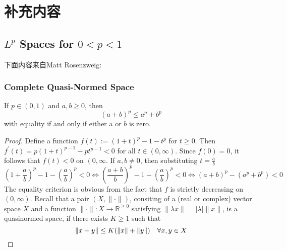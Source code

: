 \chapter{补充内容}
\section{$L^{p}$ Spaces for $0<p<1$}
下面内容来自Matt Rosenzweig:
\subsection{Complete Quasi-Normed Space}
\begin{lemma}
If $p \in(0,1)$ and $a, b \geq 0$, then
\[
    (a+b)^{p} \leq a^{p}+b^{p}
\]
with equality if and only if either a or $b$ is zero.
\end{lemma}
\begin{proof}
    Define a function $f(t):=(1+t)^{p}-1-t^{p}$ for $t \geq 0 .$ Then $f^{\prime}(t)=p(1+t)^{p-1}-p t^{p-1}<0$ for all $t \in(0, \infty)$. Since $f(0)=0$, it follows that $f(t)<0$ on $\left(0, \infty\right.$. If $a, b \neq 0$, then substituting $t=\frac{a}{b}$
    \[
        \left(1+\frac{a}{b}\right)^{p}-1-\left(\frac{a}{b}\right)^{p}<0 \Longleftrightarrow\left(\frac{a+b}{b}\right)^{p}-1-\left(\frac{a}{b}\right)^{p}<0 \Longleftrightarrow(a+b)^{p}-\left(a^{p}+b^{p}\right)<0
    \]
    The equality criterion is obvious from the fact that $f$ is strictly decreasing on $(0, \infty)$.
    Recall that a pair $(X,\|\cdot\|)$, consiting of a (real or complex) vector space $X$ and a function $\|\cdot\|: X \rightarrow \mathbb{R}^{\geq 0}$ satisfying $\|\lambda x\|=|\lambda|\|x\|$, is a quasinormed space, if there exists $K \geq 1$ such that
    \[
        \|x+y\| \leq K(\|x\|+\|y\|) \quad \forall x, y \in X \qedhere
    \]
\end{proof}

